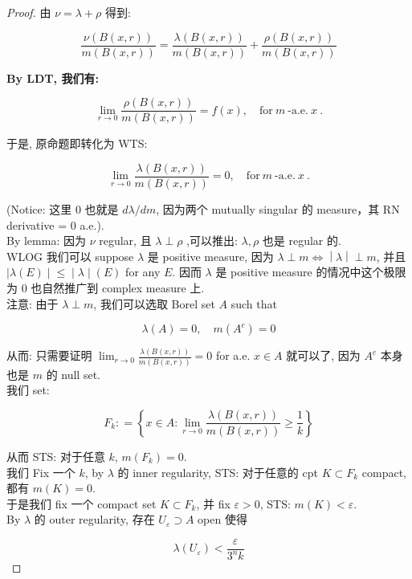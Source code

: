 \begin{proof}

由 \(\nu = \lambda + \rho\) 得到:

\[\frac{\nu(B(x,r))}{m(B(x,r))} = \frac{\lambda(B(x,r))}{m(B(x,r))} + \frac{\rho(B(x,r))}{m(B(x,r))}\]

\textbf{By LDT, 我们有:}

\[\lim\limits_{r\rightarrow 0}\frac{\rho(B(x,r))}{m(B(x,r))} = f(x),\quad\text{for}\ m\ \text{-a.e.}\ x\ \text{.}\]

于是, 原命题即转化为 WTS:

\[\lim\limits_{r\rightarrow 0}\frac{\lambda(B(x,r))}{m(B(x,r))} = 0,\quad\text{for}\ m\ \text{-a.e.}\ x\ \text{.}\]

(Notice: 这里 \(0\) 也就是 \(d\lambda/dm\), 因为两个 mutually singular 的 measure，其 RN derivative = \(0\) a.e.).\\
By lemma: 因为 \(\nu\) regular, 且 \(\lambda \perp \rho\) ,可以推出: \(\lambda,\rho\) 也是 regular 的.\\
WLOG 我们可以 suppose \(\lambda\) 是 positive measure, 因为 \(\left. \lambda \perp m\Leftrightarrow \middle| \lambda \middle| \perp m \right.\), 并且\(\left. |\lambda(E) \middle| \leq \middle| \lambda \middle| (E) \right.\) for any \(E\). 因而 \(\lambda\) 是 positive measure 的情况中这个极限为 \(0\) 也自然推广到 complex measure 上.\\
注意: 由于 \(\lambda \perp m\), 我们可以选取 Borel set \(A\) such that

\[\lambda(A) = 0,\quad m(A^{c}) = 0\]

从而: 只需要证明 \(\lim_{r\rightarrow 0}\frac{\lambda(B(x,r))}{m(B(x,r))} = 0\) for a.e. \(x \in A\) 就可以了, 因为 \(A^{c}\) 本身也是 \(m\) 的 null set.\\
我们 set:

\[F_{k}: = \left\{ {x \in A:\lim\limits_{r\rightarrow 0}\frac{\lambda(B(x,r))}{m(B(x,r))} \geq \frac{1}{k}} \right\}\]

从而 STS: 对于任意 \(k\), \(m(F_{k}) = 0\).\\
我们 Fix 一个 \(k\), by \(\lambda\) 的 inner regularity, STS: 对于任意的 cpt \(K \subset F_{k}\) compact, 都有 \(m(K) = 0\).\\
于是我们 fix 一个 compact set \(K \subset F_{k}\), 并 fix \(\varepsilon > 0\), STS: \(m(K) < \varepsilon\).\\
By \(\lambda\) 的 outer regularity, 存在 \(U_{\varepsilon} \supset A\) open 使得

\[\lambda(U_{\varepsilon}) < \frac{\varepsilon}{3^{n}k}\]


\end{proof}
